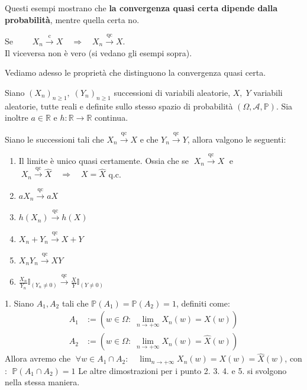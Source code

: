 Questi esempi mostrano che \textbf{la convergenza quasi certa dipende dalla probabilità}, mentre quella certa no.

\begin{proposizione}
    Se $\qquad X_n \overset{\text{c}}{\longrightarrow}X \quad \Rightarrow\quad X_n \overset{\text{qc}}{\longrightarrow}X$.\\
    Il viceversa non è vero (si vedano gli esempi sopra).
\end{proposizione}
\bigskip
\noindent Vediamo adesso le proprietà che distinguono la convergenza quasi certa.

\begin{teorema}
\label{th:prop_conv_qc}
    Siano $(X_n)_{n\geq1}, \;(Y_n)_{n\geq1}$ successioni di variabili aleatorie, $X, \;Y$ variabili aleatorie, tutte reali e definite sullo stesso spazio di probabilità $(\Omega, \mathcal{A},\mathbb P)$. Sia inoltre $a\in\mathbb R$ e $h:\mathbb{R}\to\mathbb R$ continua.

    \medskip
    \noindent Siano le successioni tali che $X_n \overset{\text{qc}}{\longrightarrow}X$ e che $Y_n \overset{\text{qc}}{\longrightarrow}Y$, allora valgono le seguenti:
    \begin{enumerate}
        \item Il limite è unico quasi certamente. Ossia che se $\;X_n \overset{\text{qc}}{\longrightarrow}X\;$ e $\;X_n \overset{\text{qc}}{\longrightarrow}\widehat{X} \quad \Rightarrow\quad X = \widehat{X}$ q.c.
        \item $aX_n \overset{\text{qc}}{\longrightarrow}aX$
        \item $h(X_n) \overset{\text{qc}}{\longrightarrow}h(X)$
        \item $X_n + Y_n\overset{\text{qc}}{\longrightarrow}X+Y$
        \item $X_nY_n \overset{\text{qc}}{\longrightarrow}XY$
        \item $\frac{X_n}{Y_n} \mathbb{I}_{(Y_n\neq0)} \overset{\text{qc}}{\longrightarrow}\frac{X}{Y} \mathbb{I}_{(Y\neq0)}$
    \end{enumerate}

    \begin{dimostrazione}
        1. Siano $A_1, A_2$ tali che $\mathbb{P}(A_1) = \mathbb{P}(A_2) = 1$, definiti come:
        \begin{align*}
            A_1 & :=\left(w\in\Omega:\;\lim_{n\to+\infty}X_n(w) = X(w)\right)\\
            A_2 & :=\left(w\in\Omega:\;\lim_{n\to+\infty}X_n(w) = \widehat{X}(w)\right)
        \end{align*}
        Allora avremo che $\;\forall w\in A_1\cap A_2:\quad \lim_{n\to+\infty}X_n(w) = X(w) = \widehat{X}(w)$, con : $\;\mathbb{P}(A_1\cap A_2) = 1$
        \bigskip
        \noindent Le altre dimostrazioni per i punto 2. 3. 4. e 5. si svolgono nella stessa maniera.
    \end{dimostrazione}
\end{teorema}

